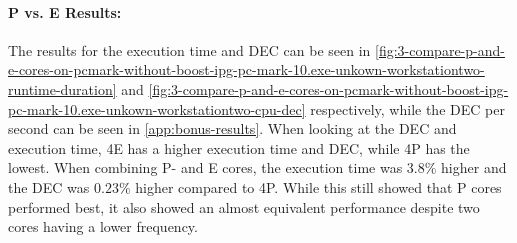 


\paragraph{P vs. E Results:} The results for the execution time and DEC can be seen in  \cref{fig:3-compare-p-and-e-cores-on-pcmark-without-boost-ipg-pc-mark-10.exe-unkown-workstationtwo-runtime-duration} and  \cref{fig:3-compare-p-and-e-cores-on-pcmark-without-boost-ipg-pc-mark-10.exe-unkown-workstationtwo-cpu-dec} respectively, while the DEC per second can be seen in \cref{app:bonus-results}. When looking at the DEC and execution time, 4E has a higher execution time and DEC, while 4P has the lowest. When combining P- and E cores, the execution time was $3.8\%$ higher and the DEC was $0.23\%$ higher compared to 4P. While this still showed that P cores performed best, it also showed an almost equivalent performance despite two cores having a lower frequency.


